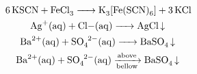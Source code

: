 \begin{gather}
    \ce{6KSCN + FeCl3 -> K3[Fe(SCN)6] + 3KCl}
    \nonumber
    \\
    \ce{Ag+(aq) + Cl-(aq) -> AgCl v}
    \nonumber
    \\
    \ce{Ba^{2+}(aq) + SO4^{2-}(aq) -> BaSO4 v}
    \\
    \ce{Ba^{2+}(aq) + SO4^{2-}(aq) ->[\mathrm{above}][\mathrm{bellow}] BaSO4 v}
    \nonumber
\end{gather}
